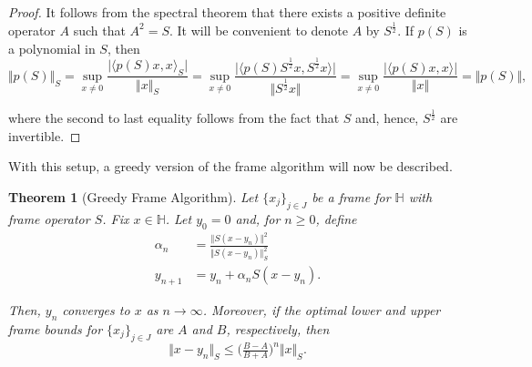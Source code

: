 \documentclass[11pt]{amsart}
\newcounter{Theorem}
\numberwithin{Theorem}{section}
\newtheorem{theorem}[Theorem]{Theorem}
\theoremstyle{definition}
\begin{document}
\begin{proof}
It follows from the spectral theorem that there exists a positive definite operator $A$ such that $A^{2}=S$.  It will be convenient to denote $A$ by $S^{\frac{1}{2}}$.  If $p(S)$ is a polynomial in $S$, then
$$ \Vert p(S) \Vert_{S} = \sup_{x\neq 0} \frac{\vert \langle p(S) x,x\rangle_{S}\vert}{\Vert x \Vert_{S}} 
                        = \sup_{x\neq 0} \frac{\vert \langle p(S)S^{\frac{1}{2}}x,S^{\frac{1}{2}}x\rangle \vert}{\Vert S^{\frac{1}{2}} x \Vert} 
                        = \sup_{x\neq 0} \frac{\vert \langle p(S)x,x\rangle \vert}{\Vert x \Vert} 
                        = \Vert p(S)\Vert, $$

\noindent
where the second to last equality follows from the fact that $S$ and, hence, $S^{\frac{1}{2}}$ are invertible.
\end{proof}

With this setup, a greedy version of the frame algorithm will now be described.


\begin{theorem}[Greedy Frame Algorithm] \label{thm:greedy}
Let $\lbrace x_{j} \rbrace_{j\in J}$ be a frame for $\mathbb{H}$ with frame operator $S$.  Fix $x \in \mathbb{H}$.  Let $y_{0}=0$ and, for $n\ge 0$, define
\begin{equation} \label{eq:greedy}
\begin{aligned}
\alpha_{n} &= \frac{\Vert S(x-y_{n})\Vert^{2}}{\Vert S(x-y_{n})\Vert_{S}^{2}} \\[4pt]
y_{n+1} &= y_{n} + \alpha_{n} S(x-y_{n}).
\end{aligned}
\end{equation}

\noindent
Then, $y_{n}$ converges to $x$ as $n\rightarrow \infty$.  Moreover, if the optimal lower and upper frame bounds for $\lbrace x_{j} \rbrace_{j\in J}$ are $A$ and $B$, respectively, then
\begin{equation} \label{eq:greedy-bound}
\Vert x-y_{n} \Vert_{S} \le \big ( \tfrac{B-A}{B+A} \big )^{n} \Vert x \Vert_{S}.
\end{equation}
\end{theorem}
\end{document}
